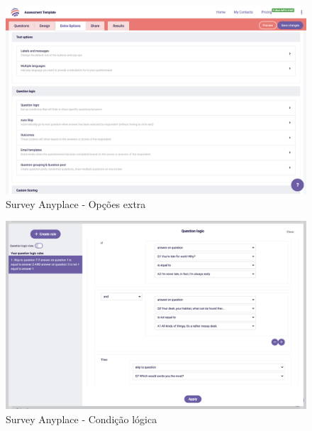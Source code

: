 \newpage

\begin{figure}[ht!]
	\begin{center}
		\includegraphics[width=1\textwidth]{img/sap/extra}
		\caption{Survey Anyplace - Opções extra }
		\label{fig:sap-extra}
	\end{center}
\end{figure}
\mbox{}
\begin{figure}[ht!]
	\begin{center}
		\includegraphics[width=1\textwidth]{img/sap/condicao}
		\caption{Survey Anyplace - Condição lógica}
		\label{fig:sap-condicao}
	\end{center}
\end{figure}


